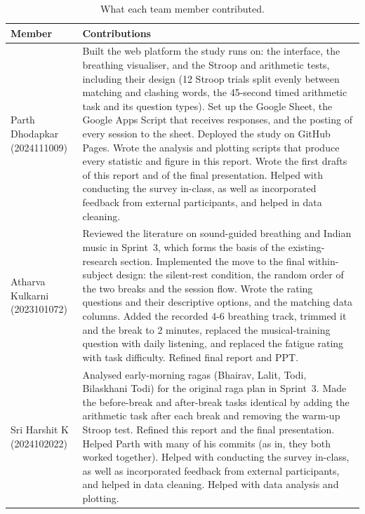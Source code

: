 \documentclass[11pt,a4paper]{article}
\begin{document}
\begin{table}[H]
\centering\small
\caption{What each team member contributed.}
\label{tab:contrib}
\begin{tabularx}{\textwidth}{>{\raggedright\arraybackslash}p{3.4cm}L}
\toprule
\textbf{Member} & \textbf{Contributions}\\
\midrule
Parth Dhodapkar (2024111009) & Built the web platform the study runs on: the interface, the breathing visualiser, and the Stroop and arithmetic tests, including their design (12 Stroop trials split evenly between matching and clashing words, the 45-second timed arithmetic task and its question types). Set up the Google Sheet, the Google Apps Script that receives responses, and the posting of every session to the sheet. Deployed the study on GitHub Pages. Wrote the analysis and plotting scripts that produce every statistic and figure in this report. Wrote the first drafts of this report and of the final presentation. Helped with conducting the survey in-class, as well as incorporated feedback from external participants, and helped in data cleaning.\\
\addlinespace
Atharva Kulkarni (2023101072) & Reviewed the literature on sound-guided breathing and Indian music in Sprint~3, which forms the basis of the existing-research section. Implemented the move to the final within-subject design: the silent-rest condition, the random order of the two breaks and the session flow. Wrote the rating questions and their descriptive options, and the matching data columns. Added the recorded 4-6 breathing track, trimmed it and the break to 2 minutes, replaced the musical-training question with daily listening, and replaced the fatigue rating with task difficulty. Refined final report and PPT.\\
\addlinespace
Sri Harshit K (2024102022) & Analysed early-morning ragas (Bhairav, Lalit, Todi, Bilaskhani Todi) for the original raga plan in Sprint~3. Made the before-break and after-break tasks identical by adding the arithmetic task after each break and removing the warm-up Stroop test. Refined this report and the final presentation. Helped Parth with many of his commits (as in, they both worked together). Helped with conducting the survey in-class, as well as incorporated feedback from external participants, and helped in data cleaning. Helped with data analysis and plotting.\\
\bottomrule
\end{tabularx}
\end{table}
\end{document}
